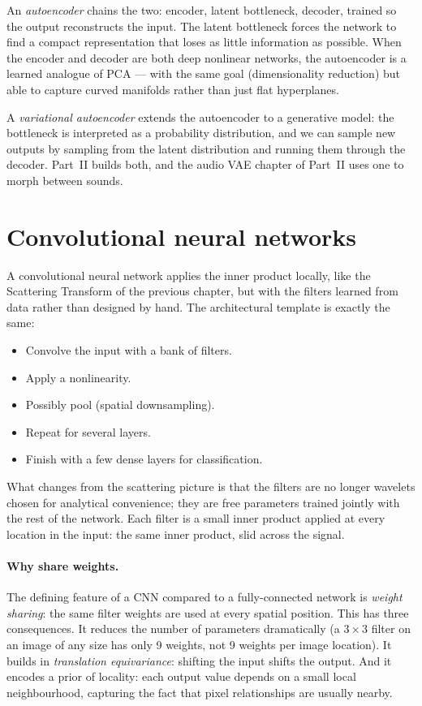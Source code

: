 \noindent An \emph{autoencoder} chains the two: encoder, latent
bottleneck, decoder, trained so the output reconstructs the input.
The latent bottleneck forces the network to find a compact
representation that loses as little information as possible.  When the
encoder and decoder are both deep nonlinear networks, the autoencoder
is a learned analogue of PCA --- with the same goal (dimensionality
reduction) but able to capture curved manifolds rather than just flat
hyperplanes.

A \emph{variational autoencoder} extends the autoencoder to a
generative model: the bottleneck is interpreted as a probability
distribution, and we can sample new outputs by sampling from the
latent distribution and running them through the decoder.  Part~II
builds both, and the audio VAE chapter of Part~II uses one to morph
between sounds.

\section{Convolutional neural networks}

A convolutional neural network applies the inner product locally, like
the Scattering Transform of the previous chapter, but with the filters
learned from data rather than designed by hand.  The architectural
template is exactly the same:

\begin{itemize}
    \item Convolve the input with a bank of filters.
    \item Apply a nonlinearity.
    \item Possibly pool (spatial downsampling).
    \item Repeat for several layers.
    \item Finish with a few dense layers for classification.
\end{itemize}

\noindent What changes from the scattering picture is that the filters
are no longer wavelets chosen for analytical convenience; they are
free parameters trained jointly with the rest of the network.  Each
filter is a small inner product applied at every location in the input:
the same inner product, slid across the signal.

\paragraph{Why share weights.}  The defining feature of a CNN compared
to a fully-connected network is \emph{weight sharing}: the same filter
weights are used at every spatial position.  This has three
consequences.  It reduces the number of parameters dramatically (a
$3 \times 3$ filter on an image of any size has only 9 weights, not 9
weights per image location).  It builds in \emph{translation
equivariance}: shifting the input shifts the output.  And it encodes
a prior of locality: each output value depends on a small local
neighbourhood, capturing the fact that pixel relationships are
usually nearby.

